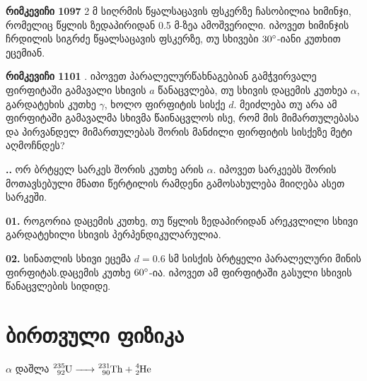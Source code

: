 \documentclass[a4paper]{book}
\begin{document}
\textbf{რიმკევიჩი 1097} 2 მ სიღრმის წყალსაცავის ფსკერზე ჩასობილია ხიმინჯი, რომელიც წყლის ზედაპირიდან 0.5 მ-ზეა ამოშვერილი. იპოვეთ ხიმინჯის ჩრდილის სიგრძე წყალსაცავის ფსკერზე, თუ სხივები $30 \degree$-იანი კუთხით ეცემიან.

\textbf{რიმკევიჩი 1101} . იპოვეთ პარალელურწახნაგებიან გამჭვირვალე ფირფიტაში გამავალი სხივის $a$ წანაცვლება, თუ სხივის დაცემის კუთხეა $\alpha$, გარდატეხის კუთხე $\gamma$, ხოლო ფირფიტის სისქე $d$. მეიძლება თუ არა ამ ფირფიტაში გამავალმა სხივმა წაინაცვლოს ისე, რომ მის მიმართულებასა და პირვანდელ მიმართულებას შორის მანძილი ფირფიტის სისქეზე მეტი აღმოჩნდეს?

\textbf{..} 
ორ ბრტყელ სარკეს შორის კუთხე არის $\alpha$. იპოვეთ სარკეებს შორის მოთავსებული მნათი წერტილის რამდენი გამოსახულება მიიღება ასეთ სარკეში.

\textbf{01.}
როგორია დაცემის კუთხე, თუ წყლის ზედაპირიდან არეკვლილი სხივი გარდატეხილი სხივის პერპენდიკულარულია.

\textbf{02.}
სინათლის სხივი ეცემა $d = 0.6$ სმ სისქის ბრტყელი პარალელური მინის ფირფიტას.დაცემის კუთხე $60 \degree$-ია. იპოვეთ ამ ფირფიტაში გასული სხივის წანაცვლების სიდიდე.

\chapter{ბირთვული ფიზიკა}
$\alpha$ დაშლა $\ce{^235_92U -> ^231_90Th + ^4_2He}$
\end{document}
